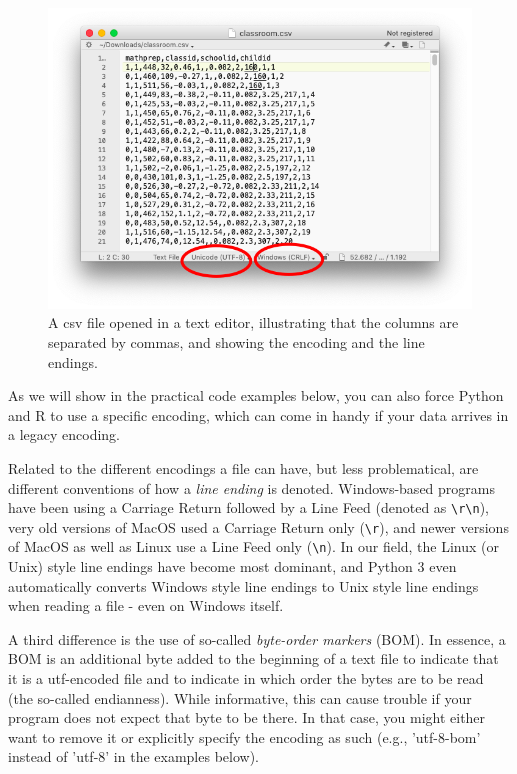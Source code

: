 \begin{figure}
\centering
\includegraphics[width=0.9\linewidth]{figures/ch6_csv-in-editor}
\caption{A csv file opened in a text editor, illustrating that the columns are separated by commas, and showing the encoding and the line endings.}
\label{fig:csv-in-editor}
\end{figure}

As we will show in the practical code examples below, you can also force Python and R to use a specific encoding, which can come in handy if your data arrives in a legacy encoding.

Related to the different encodings a file can have, but less problematical, are different conventions of how a \emph{line ending} is denoted. Windows-based programs have been using a Carriage Return followed by a Line Feed (denoted as \texttt{\textbackslash r\textbackslash n}), very old versions of MacOS used a Carriage Return only (\texttt{\textbackslash r}), and newer versions of MacOS as well as Linux use a Line Feed only (\texttt{\textbackslash n}). In our field, the Linux (or Unix) style line endings have become most dominant, and Python 3 even automatically converts Windows style line endings to Unix style line endings when reading a file - even on Windows itself.

A third difference is the use of so-called \emph{byte-order markers} (BOM). In essence, a BOM is an additional byte added to the beginning of a text file to indicate that it is a utf-encoded file and to indicate in which order the bytes are to be read (the so-called endianness). While informative, this can cause trouble if your program does not expect that byte to be there. In that case, you might either want to remove it or explicitly specify the encoding as such (e.g., 'utf-8-bom' instead of 'utf-8' in the examples below).


